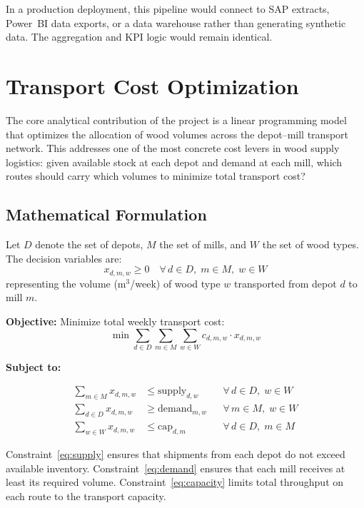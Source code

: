 \documentclass[11pt,a4paper]{article}
\begin{document}
In a production deployment, this pipeline would connect to SAP extracts, Power~BI data exports, or a data warehouse rather than generating synthetic data. The aggregation and KPI logic would remain identical.


\section{Transport Cost Optimization}

The core analytical contribution of the project is a linear programming model that optimizes the allocation of wood volumes across the depot--mill transport network. This addresses one of the most concrete cost levers in wood supply logistics: given available stock at each depot and demand at each mill, which routes should carry which volumes to minimize total transport cost?

\subsection{Mathematical Formulation}

Let $D$ denote the set of depots, $M$ the set of mills, and $W$ the set of wood types. The decision variables are:
\[
x_{d,m,w} \geq 0 \quad \forall\, d \in D,\; m \in M,\; w \in W
\]
representing the volume (m$^3$/week) of wood type $w$ transported from depot $d$ to mill $m$.

\textbf{Objective:} Minimize total weekly transport cost:
\begin{equation}
\min \sum_{d \in D} \sum_{m \in M} \sum_{w \in W} c_{d,m,w} \cdot x_{d,m,w}
\label{eq:objective}
\end{equation}

\textbf{Subject to:}

\begin{align}
\sum_{m \in M} x_{d,m,w} &\leq \text{supply}_{d,w} && \forall\, d \in D,\; w \in W \label{eq:supply}\\[4pt]
\sum_{d \in D} x_{d,m,w} &\geq \text{demand}_{m,w} && \forall\, m \in M,\; w \in W \label{eq:demand}\\[4pt]
\sum_{w \in W} x_{d,m,w} &\leq \text{cap}_{d,m} && \forall\, d \in D,\; m \in M \label{eq:capacity}
\end{align}

Constraint~\eqref{eq:supply} ensures that shipments from each depot do not exceed available inventory. Constraint~\eqref{eq:demand} ensures that each mill receives at least its required volume. Constraint~\eqref{eq:capacity} limits total throughput on each route to the transport capacity.
\end{document}
